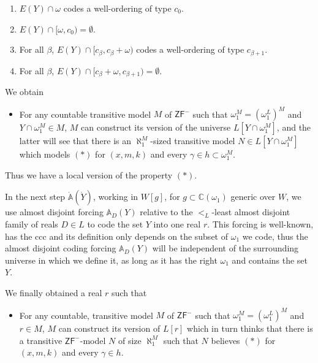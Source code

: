 \documentclass[10pt,a4paper]{amsart}
\newcommand{\ZFP}{\mathsf{ZF}^-}
\begin{document}
\begin{enumerate}
\item $E(Y) \cap \omega$ codes a well-ordering of type $c_0$.
\item $E(Y) \cap [\omega, c_0) = \emptyset$.
\item For all $\beta$, $E(Y) \cap [c_{\beta}, c_{\beta} + \omega)$ codes a well-ordering of type $c_{\beta+1}$.
\item For all $\beta$, $E(Y) \cap [c_{\beta}+\omega, c_{\beta+1})= \emptyset$.
\end{enumerate}
We obtain
\begin{itemize}
\item[$({\ast}{\ast})$] For any countable transitive model $M$ of $\ZFP$ such that $\omega_1^M=(\omega_1^L)^M$ and $ Y \cap \omega_1^M \in M$, $M$ can construct its version of the universe $L[Y \cap \omega_1^M]$, and the latter will see that there is an $\aleph_1^M$-sized transitive model $N \in L[Y \cap \omega_1^M]$ which models $(\ast)$ for $(x,m,k)$ and every $\gamma \in h \subset \omega_1^M$.
\end{itemize}
Thus we have a local version of the property $(\ast)$.

In the next step $\dot{\mathbb{A}} (\dot{Y})$, working in $W[g]$, for $g\subset \mathbb{C} (\omega_1)$ generic over $W$, we use almost disjoint forcing $\mathbb{A}_D(Y)$ relative to the $<_L$-least almost disjoint family of reals $D \in  L $ to code the set $Y$ into one real $r$. This forcing is well-known, has the ccc and its definition only depends on the subset of $\omega_1$ we code, thus the almost disjoint coding forcing  $\mathbb{A}_D(Y)$ will be independent of the surrounding universe in which we define it, as long as it has the right $\omega_1$ and contains the set $Y$.

We finally obtained a real $r$ such that
\begin{itemize}
\item[$({\ast}{\ast}{\ast})$] For any countable, transitive model $M$ of $\ZFP$ such that $\omega_1^M=(\omega_1^L)^M$ and $ r  \in M$, $M$ can construct its version of $L[r]$ which in turn thinks that there is a transitive $\ZFP$-model $N$ of size $\aleph_1^M$  such that $N$ believes $(\ast)$ for $(x,m,k)$ and every $\gamma \in h$.
\end{itemize}
\end{document}
